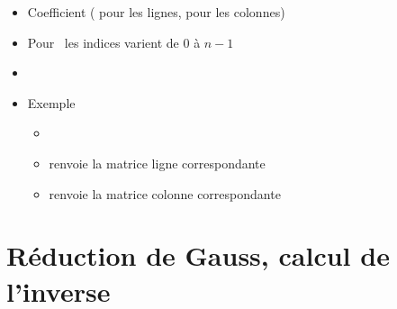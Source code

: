 \begin{frame}

\begin{itemize}
  \item Coefficient  (
  pour les lignes,  pour les colonnes)
\pause

  \item Pour \Sage\ les indices varient de $0$ à $n-1$
\pause
  
  \item  {}
   \pause
   
  \item Exemple
  \begin{itemize}
    \item {}
    \pause
    
    \item {} renvoie la matrice ligne correspondante
    \pause
    
    \item {} renvoie la matrice colonne correspondante    
  \end{itemize} 
\end{itemize}


%
%
%
%
%
\end{frame}



\section{Réduction de Gauss, calcul de l'inverse}

